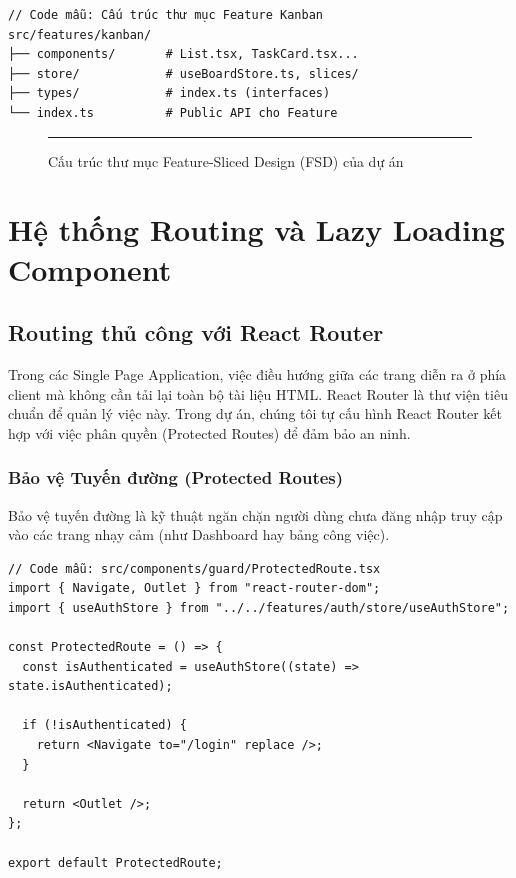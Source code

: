 \begin{Verbatim}
// Code mẫu: Cấu trúc thư mục Feature Kanban
src/features/kanban/
├── components/       # List.tsx, TaskCard.tsx...
├── store/            # useBoardStore.ts, slices/
├── types/            # index.ts (interfaces)
└── index.ts          # Public API cho Feature
\end{Verbatim}

\begin{figure}[H]
    \centering
    \rule{0.6\textwidth}{0.5\textwidth}
    \caption{Cấu trúc thư mục Feature-Sliced Design (FSD) của dự án}
\end{figure}

\chapter{Hệ thống Routing và Lazy Loading Component}

\section{Routing thủ công với React Router}
Trong các Single Page Application, việc điều hướng giữa các trang diễn ra ở phía client mà không cần tải lại toàn bộ tài liệu HTML. React Router là thư viện tiêu chuẩn để quản lý việc này. Trong dự án, chúng tôi tự cấu hình React Router kết hợp với việc phân quyền (Protected Routes) để đảm bảo an ninh.

\subsection{Bảo vệ Tuyến đường (Protected Routes)}
Bảo vệ tuyến đường là kỹ thuật ngăn chặn người dùng chưa đăng nhập truy cập vào các trang nhạy cảm (như Dashboard hay bảng công việc).

\begin{Verbatim}
// Code mẫu: src/components/guard/ProtectedRoute.tsx
import { Navigate, Outlet } from "react-router-dom";
import { useAuthStore } from "../../features/auth/store/useAuthStore";

const ProtectedRoute = () => {
  const isAuthenticated = useAuthStore((state) => state.isAuthenticated);

  if (!isAuthenticated) {
    return <Navigate to="/login" replace />;
  }

  return <Outlet />;
};

export default ProtectedRoute;
\end{Verbatim}

